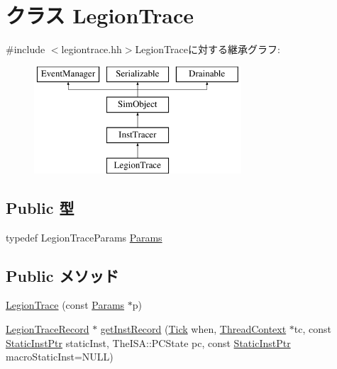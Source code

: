 \hypertarget{classTrace_1_1LegionTrace}{
\section{クラス LegionTrace}
\label{classTrace_1_1LegionTrace}
}


{\ttfamily \#include $<$legiontrace.hh$>$}LegionTraceに対する継承グラフ:\begin{figure}[H]
\begin{center}
\leavevmode
\includegraphics[height=4cm]{classTrace_1_1LegionTrace}
\end{center}
\end{figure}
\subsection*{Public 型}
\begin{DoxyCompactItemize}
\item 
typedef LegionTraceParams \hyperlink{classTrace_1_1LegionTrace_ac9d15a61af503a8c154a6dc072dd2b3b}{Params}
\end{DoxyCompactItemize}
\subsection*{Public メソッド}
\begin{DoxyCompactItemize}
\item 
\hyperlink{classTrace_1_1LegionTrace_af0e4932042e6f5323bff3cef8f36e126}{LegionTrace} (const \hyperlink{classTrace_1_1LegionTrace_ac9d15a61af503a8c154a6dc072dd2b3b}{Params} $\ast$p)
\item 
\hyperlink{classTrace_1_1LegionTraceRecord}{LegionTraceRecord} $\ast$ \hyperlink{classTrace_1_1LegionTrace_a1c7bdae6744541417139f6c6353fd76f}{getInstRecord} (\hyperlink{base_2types_8hh_a5c8ed81b7d238c9083e1037ba6d61643}{Tick} when, \hyperlink{classThreadContext}{ThreadContext} $\ast$tc, const \hyperlink{classRefCountingPtr}{StaticInstPtr} staticInst, TheISA::PCState pc, const \hyperlink{classRefCountingPtr}{StaticInstPtr} macroStaticInst=NULL)
\end{DoxyCompactItemize}


